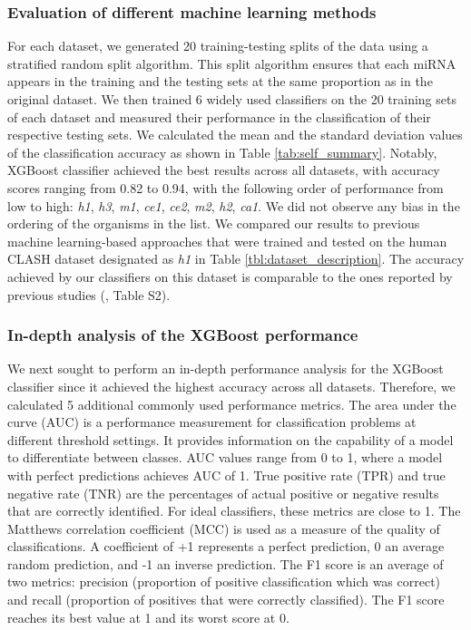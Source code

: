 \documentclass{bmcart}
\begin{document}
\subsubsection*{Evaluation of different machine learning methods} \label{sec:evaluation_different_ML}
For each dataset, we generated 20 training-testing splits of the data using a stratified random split algorithm. This split algorithm ensures that each miRNA appears in the training and the testing sets at the same proportion as in the original dataset.
We then trained 6 widely used classifiers on the 20 training sets of each dataset and measured their performance in the classification of their respective testing sets. We calculated the mean and the standard deviation values of the classification accuracy as shown in Table \ref{tab:self_summary}. Notably, XGBoost classifier achieved the best results across all datasets, with accuracy scores ranging from 0.82 to 0.94, with the following order of performance from low to high: \textit{h1},  \textit{h3},  \textit{m1}, \textit{ce1}, \textit{ce2}, \textit{m2}, \textit{h2}, \textit{ca1}. We did not observe any bias in the ordering of the organisms in the list.   
We compared our results to previous machine learning-based approaches that were trained and tested on the human CLASH dataset designated as \textit{h1} in Table \ref{tbl:dataset_description}. The accuracy achieved by our classifiers on this dataset is comparable to the ones reported by previous studies (, Table S2). 



\subsubsection*{In-depth analysis of the XGBoost performance}
We next sought to perform an in-depth performance analysis for the XGBoost classifier since it achieved the highest accuracy across all datasets. Therefore, we calculated 5 additional commonly used performance metrics. 
The area under the curve (AUC) is a performance measurement for classification problems at different threshold settings. It provides information on the capability of a model to differentiate between classes. AUC values range from 0 to 1, where a model with perfect predictions achieves AUC of 1. 
True positive rate (TPR) and true negative rate (TNR) are the percentages of actual positive or negative results that are correctly identified.  For ideal classifiers, these metrics are close to 1. The Matthews correlation coefficient (MCC) is used as a measure of the quality of classifications. A coefficient of +1 represents a perfect prediction, 0 an average random prediction, and -1 an inverse prediction. 
The F1 score is an average of two metrics: precision (proportion of positive classification which was correct) and recall (proportion of positives that were correctly classified). The F1 score reaches its best value at 1 and its worst score at 0. 
\end{document}
